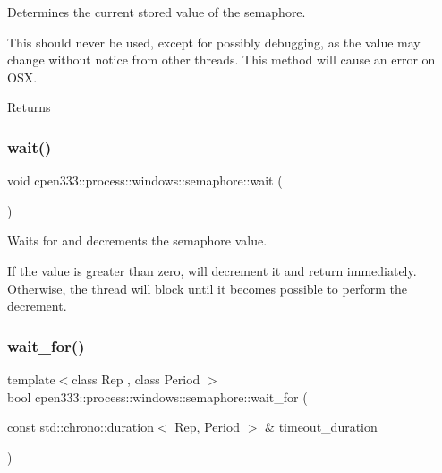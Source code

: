 Determines the current stored value of the semaphore. 

This should never be used, except for possibly debugging, as the value may change without notice from other threads. This method will cause an error on O\+SX.

\begin{DoxyReturn}{Returns}

\end{DoxyReturn}
\mbox{\label{classcpen333_1_1process_1_1windows_1_1semaphore_a523d89b784ed47ade79d4ecf836f042d}} 
\subsubsection{\texorpdfstring{wait()}{wait()}}
{\footnotesize\ttfamily void cpen333\+::process\+::windows\+::semaphore\+::wait (\begin{DoxyParamCaption}{ }\end{DoxyParamCaption})\hspace{0.3cm}{\ttfamily [inline]}}



Waits for and decrements the semaphore value. 

If the value is greater than zero, will decrement it and return immediately. Otherwise, the thread will block until it becomes possible to perform the decrement. \mbox{\label{classcpen333_1_1process_1_1windows_1_1semaphore_a055c5a6ec94b231b04856ba78862b0ee}} 
\subsubsection{\texorpdfstring{wait\+\_\+for()}{wait\_for()}}
{\footnotesize\ttfamily template$<$class Rep , class Period $>$ \\
bool cpen333\+::process\+::windows\+::semaphore\+::wait\+\_\+for (\begin{DoxyParamCaption}\item[{const std\+::chrono\+::duration$<$ Rep, Period $>$ \&}]{timeout\+\_\+duration }\end{DoxyParamCaption})\hspace{0.3cm}{\ttfamily [inline]}}




